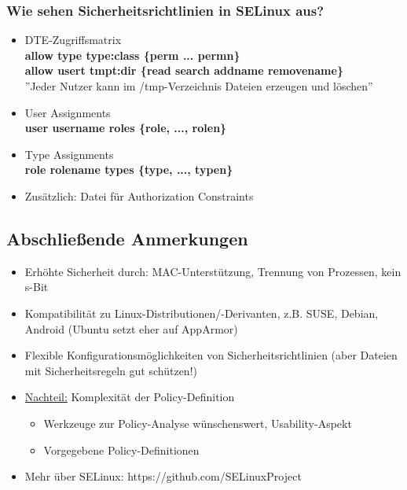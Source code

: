\documentclass[openany]{book}
\begin{document}
\subsubsection{Wie sehen Sicherheitsrichtlinien in SELinux aus?}

\begin{itemize}
    \item DTE-Zugriffsmatrix \\ \textbf{allow type type:class \{perm ... perm\textunderscore n\}} \\ \textbf{allow user\textunderscore t tmp\textunderscore t:dir \{read search add\textunderscore name remove\textunderscore name\}} \\ ''Jeder Nutzer kann im /tmp-Verzeichnis Dateien erzeugen und löschen''
    \item User Assignments \\ \textbf{user username roles \{role, ..., role\textunderscore n\}}
    \item Type Assignments \\ \textbf{role rolename types \{type, ..., type\textunderscore n\}}
    \item Zusätzlich: Datei für Authorization Constraints
\end{itemize}

\subsection{Abschließende Anmerkungen}

\begin{itemize}
    \item Erhöhte Sicherheit durch: MAC-Unterstützung, Trennung von Prozessen, kein s-Bit
    \item Kompatibilität zu Linux-Distributionen/-Derivanten, z.B. SUSE, Debian, Android (Ubuntu setzt eher auf AppArmor)
    \item Flexible Konfigurationsmöglichkeiten von Sicherheitsrichtlinien (aber Dateien mit Sicherheitsregeln gut schützen!)
    \item \underline{Nachteil:} Komplexität der Policy-Definition
    \begin{itemize}
        \item Werkzeuge zur Policy-Analyse wünschenswert, Usability-Aspekt
        \item Vorgegebene Policy-Definitionen
    \end{itemize}
    \item Mehr über SELinux: https://github.com/SELinuxProject
\end{itemize}
\end{document}
